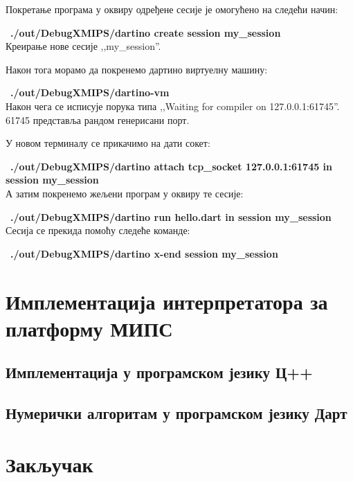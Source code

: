 \documentclass[12pt,oneside]{memoir}
\begin{document}
Покретање програма у оквиру одређене сесије је омогућено на следећи начин: 

~\textbf{./out/DebugXMIPS/dartino create session my\_session}\\
Креирање нове сесије ,,my\_session''.

Након тога морамо да покренемо дартино виртуелну машину:

~\textbf{./out/DebugXMIPS/dartino-vm}\\
Након чега се исписује порука типа ,,Waiting for compiler on 127.0.0.1:61745''. 61745 представља рандом генерисани порт.

У новом терминалу се прикачимо на дати сокет:

~\textbf{./out/DebugXMIPS/dartino attach tcp\_socket 127.0.0.1:61745 in session my\_session}\\

А затим покренемо жељени програм у оквиру те сесије:

~\textbf{./out/DebugXMIPS/dartino run hello.dart in session my\_session}\\

Сесија се прекида помоћу следеће команде:

~\textbf{./out/DebugXMIPS/dartino x-end session my\_session}\\


\chapter{Имплементација интерпретатора за платформу МИПС}
\label{chp:implementacija}

\section{Имплементација у програмском језику Ц++}


\section{Нумерички алгоритам у програмском језику Дарт}


\chapter{Закључак}
\end{document}
